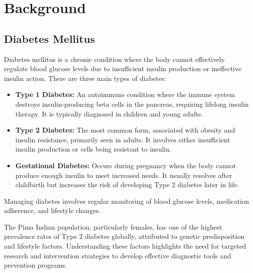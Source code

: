 \section{Background}
\subsection{Diabetes Mellitus}
Diabetes mellitus is a chronic condition where the body cannot effectively regulate blood glucose levels due to insufficient insulin production or ineffective insulin action. There are three main types of diabetes:

\begin{itemize}
\item \textbf{Type 1 Diabetes:} An autoimmune condition where the immune system destroys insulin-producing beta cells in the pancreas, requiring lifelong insulin therapy. It is typically diagnosed in children and young adults.
\item \textbf{Type 2 Diabetes:} The most common form, associated with obesity and insulin resistance, primarily seen in adults. It involves either insufficient insulin production or cells being resistant to insulin.
\item \textbf{Gestational Diabetes:} Occurs during pregnancy when the body cannot produce enough insulin to meet increased needs. It usually resolves after childbirth but increases the risk of developing Type 2 diabetes later in life.
\end{itemize}

Managing diabetes involves regular monitoring of blood glucose levels, medication adherence, and lifestyle changes.

The Pima Indian population, particularly females, has one of the highest prevalence rates of Type 2 diabetes globally, attributed to genetic predisposition and lifestyle factors. Understanding these factors highlights the need for targeted research and intervention strategies to develop effective diagnostic tools and prevention programs.

